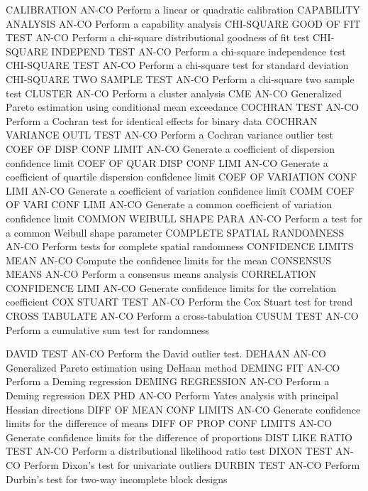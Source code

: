CALIBRATION                 AN-CO Perform a linear or quadratic calibration
CAPABILITY ANALYSIS         AN-CO Perform a capability analysis
CHI-SQUARE GOOD OF FIT TEST AN-CO Perform a chi-square distributional goodness of fit test
CHI-SQUARE INDEPEND TEST    AN-CO Perform a chi-square independence test
CHI-SQUARE TEST             AN-CO Perform a chi-square test for standard deviation
CHI-SQUARE TWO SAMPLE TEST  AN-CO Perform a chi-square two sample test
CLUSTER                     AN-CO Perform a cluster analysis
CME                         AN-CO Generalized Pareto estimation using conditional mean exceedance
COCHRAN TEST                AN-CO Perform a Cochran test for identical effects for binary data
COCHRAN VARIANCE OUTL TEST  AN-CO Perform a Cochran variance outlier test
COEF OF DISP CONF LIMIT     AN-CO Generate a coefficient of dispersion confidence limit
COEF OF QUAR DISP CONF LIMI AN-CO Generate a coefficient of quartile dispersion confidence limit
COEF OF VARIATION CONF LIMI AN-CO Generate a coefficient of variation confidence limit
COMM COEF OF VARI CONF LIMI AN-CO Generate a common coefficient of variation confidence limit
COMMON WEIBULL SHAPE PARA   AN-CO Perform a test for a common Weibull shape parameter
COMPLETE SPATIAL RANDOMNESS AN-CO Perform tests for complete spatial randomness
CONFIDENCE LIMITS MEAN      AN-CO Compute the confidence limits for the mean
CONSENSUS MEANS             AN-CO Perform a consensus means analysis
CORRELATION CONFIDENCE LIMI AN-CO Generate confidence limits for the correlation coefficient
COX STUART TEST             AN-CO Perform the Cox Stuart test for trend
CROSS TABULATE              AN-CO Perform a cross-tabulation
CUSUM TEST                  AN-CO Perform a cumulative sum test for randomness

DAVID TEST                  AN-CO Perform the David outlier test.
DEHAAN                      AN-CO Generalized Pareto estimation using DeHaan method
DEMING FIT                  AN-CO Perform a Deming regression
DEMING REGRESSION           AN-CO Perform a Deming regression
DEX PHD                     AN-CO Perform Yates analysis with principal Hessian directions
DIFF OF MEAN CONF LIMITS    AN-CO Generate confidence limits for the difference of means
DIFF OF PROP CONF LIMITS    AN-CO Generate confidence limits for the difference of proportions
DIST LIKE RATIO TEST        AN-CO Perform a distributional likelihood ratio test
DIXON TEST                  AN-CO Perform Dixon's test for univariate outliers
DURBIN TEST                 AN-CO Perform Durbin's test for two-way incomplete block designs

